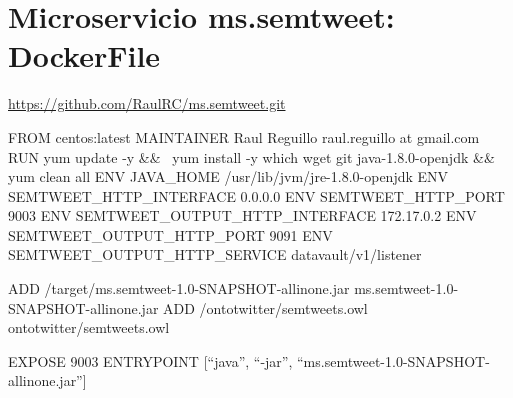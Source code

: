 \chapter{Microservicio ms.semtweet: DockerFile}
\label{chap:ms.semtweet.docker}

\url{https://github.com/RaulRC/ms.semtweet.git}

\begin{listing}[
  language = bash,
  numbers=left,
  numberstyle=\tiny,
  stepnumber=5,
  numbersep=5pt,
  frame=single,
  caption  = {ms.semtweet: DockerFile},
  label    = code:ms.semtweet.dockerfile]

FROM centos:latest
MAINTAINER Raul Reguillo raul.reguillo at gmail.com
RUN yum update -y && \
yum install -y which wget git java-1.8.0-openjdk && yum clean all
ENV JAVA_HOME /usr/lib/jvm/jre-1.8.0-openjdk
ENV SEMTWEET_HTTP_INTERFACE 0.0.0.0
ENV SEMTWEET_HTTP_PORT 9003
ENV SEMTWEET_OUTPUT_HTTP_INTERFACE 172.17.0.2
ENV SEMTWEET_OUTPUT_HTTP_PORT 9091
ENV SEMTWEET_OUTPUT_HTTP_SERVICE datavault/v1/listener

ADD /target/ms.semtweet-1.0-SNAPSHOT-allinone.jar ms.semtweet-1.0-SNAPSHOT-allinone.jar
ADD /ontotwitter/semtweets.owl ontotwitter/semtweets.owl

EXPOSE 9003
ENTRYPOINT [``java'', ``-jar'', ``ms.semtweet-1.0-SNAPSHOT-allinone.jar'']


\end{listing}
